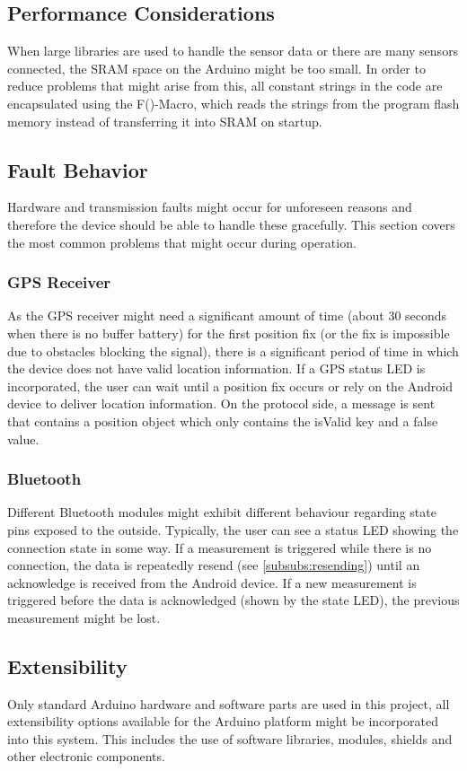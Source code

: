 \subsection{Performance Considerations}
When large libraries are used to handle the sensor data or there are many sensors connected, the SRAM space on the Arduino might be too small. In order to reduce problems that might arise from this, all constant strings in the code are encapsulated using the F()-Macro, which reads the strings from the program flash memory instead of transferring it into SRAM on startup.

\subsection{Fault Behavior}
Hardware and transmission faults might occur for unforeseen reasons and therefore the device should be able to handle these gracefully. This section covers the most common problems that might occur during operation.

\subsubsection{GPS Receiver}
As the GPS receiver might need a significant amount of time (about 30 seconds when there is no buffer battery) for the first position fix (or the fix is impossible due to obstacles blocking the signal), there is a significant period of time in which the device does not have valid location information. If a GPS status LED is incorporated, the user can wait until a position fix occurs or rely on the Android device to deliver location information. On the protocol side, a message is sent that contains a position object which only contains the isValid key and a false value. 

\subsubsection{Bluetooth}
Different Bluetooth modules might exhibit different behaviour regarding state pins exposed to the outside. Typically, the user can see a status LED showing the connection state in some way. If a measurement is triggered while there is no connection, the data is repeatedly resend (see \ref{subsubs:resending}) until an acknowledge is received from the Android device. If a new measurement is triggered before the data is acknowledged (shown by the state LED), the previous measurement might be lost.

\subsection{Extensibility}
Only standard Arduino hardware and software parts are used in this project, all extensibility options available for the Arduino platform might be incorporated into this system. This includes the use of software libraries, modules, shields and other electronic components.

